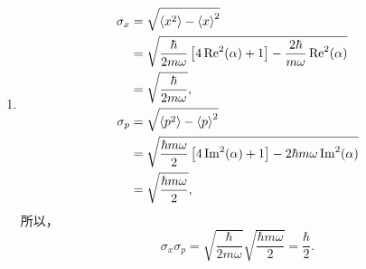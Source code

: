 \begin{enumerate}
	\begin{align*}
		\expval{p} &= \mel{\alpha}{p}{\alpha} = \mel{\alpha}{ i\sqrt{\frac{\hbar m\omega}{2}}(\hat{a}^\dagger - \hat{a}) }{\alpha} \\
		&= i\sqrt{\frac{\hbar m\omega}{2}} \left( \mel{\alpha}{\hat{a}^\dagger}{\alpha} - \mel{\alpha}{\hat{a}}{\alpha} \right) \\
		&= i\sqrt{\frac{\hbar m\omega}{2}} \left( \alpha^* - \alpha \right) \\
		&= \sqrt{2\hbar m\omega} \operatorname{Im}(\alpha), \\
		\expval{p^{2}} &= \mel{\alpha}{p^2}{\alpha} \\
		&= -\frac{\hbar m\omega}{2} \mel{\alpha}{(\hat{a}^\dagger - \hat{a})^2}{\alpha} \\
		&= -\frac{\hbar m\omega}{2} \mel{\alpha}{\hat{a}^\dagger\hat{a}^\dagger - \hat{a}^\dagger\hat{a} - \hat{a}\hat{a}^\dagger + \hat{a}\hat{a}}{\alpha} \\
		&= -\frac{\hbar m\omega}{2} \left( \alpha^{*}\alpha^{*} - \alpha^{*}\alpha - \mel{\alpha}{\hat{a}^\dagger\hat{a} + 1}{\alpha} + \alpha\alpha \right) \\
		&=- \frac{\hbar m\omega}{2} \left( \alpha^{*}\alpha^{*} + \alpha\alpha - 2\alpha^{*}\alpha - 1 \right) \\
		&= -\frac{\hbar m\omega}{2} \left[ (\alpha^{*} - \alpha)^2 - 1 \right] \\
		&= \frac{\hbar m\omega}{2} \left[ 4\operatorname{Im}^2(\alpha) + 1 \right].
	\end{align*}
	
	\item[(b)]
	\begin{align*}
		\sigma_{x} &= \sqrt{\expval{x^{2}} - \expval{x}^{2}} \\
		&= \sqrt{\frac{\hbar}{2m\omega}\left[4\operatorname{Re}^{2}(\alpha) + 1\right] - \frac{2\hbar}{m\omega}\operatorname{Re}^{2}(\alpha)} \\
		&= \sqrt{\frac{\hbar}{2m\omega}}, \\
		\sigma_{p} &= \sqrt{\expval{p^{2}} - \expval{p}^{2}} \\
		&= \sqrt{\frac{\hbar m\omega}{2}\left[4\operatorname{Im}^{2}(\alpha) + 1\right] - 2\hbar m\omega \operatorname{Im}^{2}(\alpha)} \\
		&= \sqrt{\frac{\hbar m\omega}{2}},
	\end{align*}
	所以，
	\[
	\sigma_{x} \sigma_{p} = \sqrt{\frac{\hbar}{2m\omega}} \sqrt{\frac{\hbar m\omega}{2}} = \frac{\hbar}{2}.
	\]
	

\end{enumerate}
